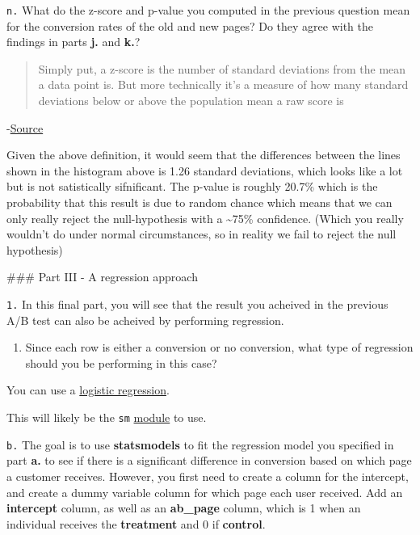 \documentclass[11pt]{article}
\providecommand{\tightlist}{%
      \setlength{\itemsep}{0pt}\setlength{\parskip}{0pt}}
\begin{document}
    \texttt{n.} What do the z-score and p-value you computed in the previous
question mean for the conversion rates of the old and new pages? Do they
agree with the findings in parts \textbf{j.} and \textbf{k.}?

    \begin{quote}
Simply put, a z-score is the number of standard deviations from the mean
a data point is. But more technically it's a measure of how many
standard deviations below or above the population mean a raw score is
\end{quote}

-\href{http://www.statisticshowto.com/probability-and-statistics/z-score/}{Source}

Given the above definition, it would seem that the differences between
the lines shown in the histogram above is 1.26 standard deviations,
which looks like a lot but is not satistically sifnificant. The p-value
is roughly 20.7\% which is the probability that this result is due to
random chance which means that we can only really reject the
null-hypothesis with a \textasciitilde{}75\% confidence. (Which you
really wouldn't do under normal circumstances, so in reality we fail to
reject the null hypothesis)

     \#\#\# Part III - A regression approach

\texttt{1.} In this final part, you will see that the result you
acheived in the previous A/B test can also be acheived by performing
regression.

\begin{enumerate}
\def\labelenumi{\alph{enumi}.}
\tightlist
\item
  Since each row is either a conversion or no conversion, what type of
  regression should you be performing in this case?
\end{enumerate}

    You can use a
\href{http://blog.yhat.com/posts/logistic-regression-python-rodeo.html}{logistic
regression}.

This will likely be the \texttt{sm}
\href{http://www.statsmodels.org/dev/generated/statsmodels.discrete.discrete_model.Logit.html}{module}
to use.

    \texttt{b.} The goal is to use \textbf{statsmodels} to fit the
regression model you specified in part \textbf{a.} to see if there is a
significant difference in conversion based on which page a customer
receives. However, you first need to create a column for the intercept,
and create a dummy variable column for which page each user received.
Add an \textbf{intercept} column, as well as an \textbf{ab\_page}
column, which is 1 when an individual receives the \textbf{treatment}
and 0 if \textbf{control}.
\end{document}
